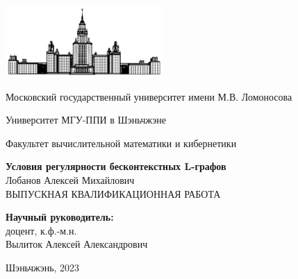 
\begin{titlepage}
	\begin{center}
		\includegraphics[width=60mm]{static_images/MSU}

	    Московский государственный университет имени М.В. Ломоносова

           Университет МГУ-ППИ в Шэньчжэне 

	    
	    Факультет вычислительной математики и кибернетики

	    \bigskip
	  

	    {\Large\bfseries Условия регулярности бесконтекстных L-графов}\\[15mm]

  {\large Лобанов Алексей Михайлович}\\[5mm]

	    {ВЫПУСКНАЯ КВАЛИФИКАЦИОННАЯ РАБОТА}\\[35mm]
	       
	    

	    \begin{flushright}
	            {\bfseries Научный руководитель:}\\
	            доцент, к.ф.-м.н.\\
	            Вылиток Алексей Александрович
	    \end{flushright}

	    \vspace{\fill}
	    Шэньчжэнь, 2023
	\end{center}
\end{titlepage}

\clearpage

